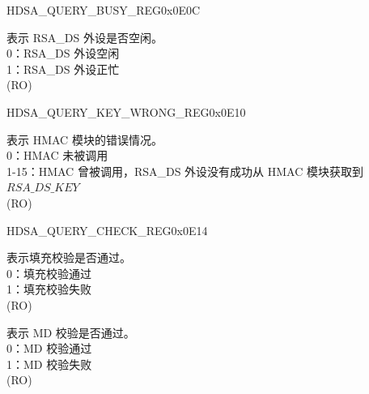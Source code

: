 \begin{register}{H}{DSA\_QUERY\_BUSY\_REG}{0x0E0C}\label{regdesc:DSAQUERYBUSYREG}
%
%
\regnewline%
\begin{regdesc}\begin{reglist}
\item [DSA\_QUERY\_BUSY] 表示 RSA\_DS 外设是否空闲。\\
0：RSA\_DS 外设空闲\\
1：RSA\_DS 外设正忙\\
(RO)
\end{reglist}\end{regdesc}
\end{register}


\begin{register}{H}{DSA\_QUERY\_KEY\_WRONG\_REG}{0x0E10}\label{regdesc:DSAQUERYKEYWRONGREG}
%
%
\regnewline%
\begin{regdesc}\begin{reglist}
\item [DSA\_QUERY\_KEY\_WRONG] 表示 HMAC 模块的错误情况。\\
0：HMAC 未被调用\\
1-15：HMAC 曾被调用，RSA\_DS 外设没有成功从 HMAC 模块获取到 \begin{math}RSA\_DS\_KEY\end{math}\\
(RO)
\end{reglist}\end{regdesc}
\end{register}


\begin{register}{H}{DSA\_QUERY\_CHECK\_REG}{0x0E14}\label{regdesc:DSAQUERYCHECKREG}
%
%
%
\regnewline%
\begin{regdesc}\begin{reglist}
\item [DSA\_PADDING\_BAD] 表示填充校验是否通过。\\
0：填充校验通过\\
1：填充校验失败\\
(RO)
\item [DSA\_MD\_ERROR] 表示 MD 校验是否通过。\\
0：MD 校验通过\\
1：MD 校验失败\\
(RO)
\end{reglist}\end{regdesc}
\end{register}


